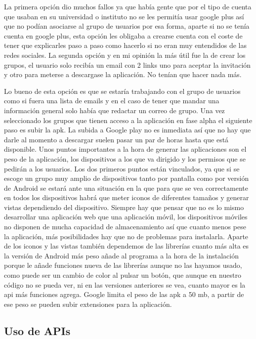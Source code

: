 La primera opción dio muchos fallos ya que había gente que por el tipo de cuenta que usaban en su universidad o instituto no se les permitía usar google plus así que no podían asociarse al grupo de usuarios por esa forma, aparte si no se tenía cuenta en google plus, esta opción les obligaba a crearse cuenta con el coste de tener que explicarles paso a paso como hacerlo si no eran muy entendidos de las redes sociales.
La segunda opción y en mi opinión la más útil fue la de crear los grupos, el usuario solo recibía un email con 2 links uno para aceptar la invitación y otro para meterse a descargase la aplicación. No tenían que hacer nada más.

Lo bueno de esta opción es que se estaría trabajando con el grupo de usuarios como si fuera una lista de emails y en el caso de tener que mandar una información general solo había que redactar un correo de grupo.
Una vez seleccionado los grupos que tienen acceso a la aplicación en fase alpha el siguiente paso es subir la apk.
La subida a Google play no es inmediata así que no hay que darle al momento a descargar suelen pasar un par de horas hasta que está disponible.
Unos puntos importantes a la hora de generar las aplicaciones son el peso de la aplicación, los dispositivos a los que va dirigido y los permisos que se pedirán a los usuarios.
Los dos primeros puntos están vinculados, ya que si se escoge un grupo muy amplio de dispositivos tanto por pantalla como por versión de Android se estará ante una situación en la que para que se vea correctamente en todos los dispositivos habrá que meter iconos de diferentes tamaños y generar vistas dependiendo del dispositivo.
Siempre hay que pensar que no es lo mismo desarrollar una aplicación web que una aplicación móvil, los dispositivos móviles no disponen de mucha capacidad de almacenamiento así que cuanto menos pese la aplicación, más posibilidades hay que no de problemas para instalarla.
Aparte de los iconos y las vistas también dependemos de las librerías cuanto más alta es la versión de Android más peso añade al programa a la hora de la instalación porque le añade funciones nueva de las librerías aunque no las hayamos usado, como puede ser un cambio de color al pulsar un botón, que aunque en nuestro código no se pueda ver, ni en las versiones anteriores se vea, cuanto mayor es la api más funciones agrega.
Google limita el peso de las apk a 50 mb, a partir de ese peso se pueden subir extensiones para la aplicación.

\subsection{Uso de APIs}
\label{subsecc:Uso de APIs}

